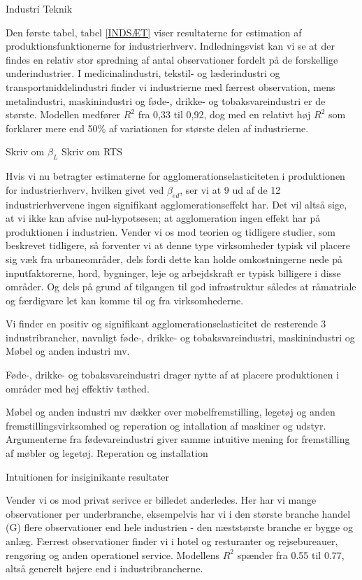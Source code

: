 \documentclass[a4paper, 12pt, titlepage]{article}
\begin{document}
Industri 
Teknik 

Den første tabel, tabel \ref{INDSÆT} viser resultaterne for estimation af produktionsfunktionerne for industrierhverv. Indledningsvist kan vi se at der findes en relativ stor spredning af antal observationer fordelt på de forskellige underindustrier. I medicinalindustri, tekstil- og læderindustri og transportmiddelindustri finder vi industrierne med færrest observation, mens metalindustri, maskinindustri og føde-, drikke- og tobaksvareindustri er de største. Modellen medfører $R^2$ fra 0,33 til 0,92, dog med en relativt høj $R^2$ som forklarer mere end 50\% af variationen for største delen af industrierne. 

Skriv om $\beta_L$
Skriv om RTS


Hvis vi nu betragter estimaterne for agglomerationselasticiteten i produktionen for industrierhverv, hvilken givet ved $\beta_{ed}$, ser vi at 9 ud af de 12 industrierhvervene ingen signifikant agglomerationseffekt har. Det vil altså sige, at vi ikke kan afvise nul-hypotsesen; at agglomeration ingen effekt har på produktionen i industrien. Vender vi os mod teorien og tidligere studier, som beskrevet tidligere, så forventer vi at denne type virksomheder typisk vil placere sig væk fra urbaneområder, dels fordi dette kan holde omkostningerne nede på inputfaktorerne, hord, bygninger, leje og arbejdskraft er typisk billigere i disse områder. Og dels på grund af tilgangen til god infrastruktur således at råmatriale og færdigvare let kan komme til og fra virksomhederne.      

Vi finder en positiv og signifikant agglomerationselasticitet de resterende 3 industribrancher, navnligt føde-, drikke- og tobaksvareindustri, maskinindustri og Møbel og anden industri mv. 

Føde-, drikke- og tobaksvareindustri drager nytte af at placere produktionen i områder med høj effektiv tæthed. 

Møbel og anden industri mv dækker over møbelfremstilling, legetøj og anden fremstillingsvirksomhed og reperation og intallation af maskiner og udstyr. Argumenterne fra fødevareindustri giver samme intuitive mening for fremstilling af møbler og legetøj. Reperation og installation 


Intuitionen for insiginikante resultater



Vender vi os mod privat serivce er billedet anderledes. Her har vi mange observationer per underbranche, eksempelvis har vi i den største branche handel (G) flere observationer end hele industrien - den næststørste branche er bygge og anlæg. Færrest observationer finder vi i hotel og resturanter og rejsebureauer, rengøring og anden operationel service. Modellens $R^2$ spænder fra 0.55 til 0.77, altså generelt højere end i industribrancherne. 
\end{document}
